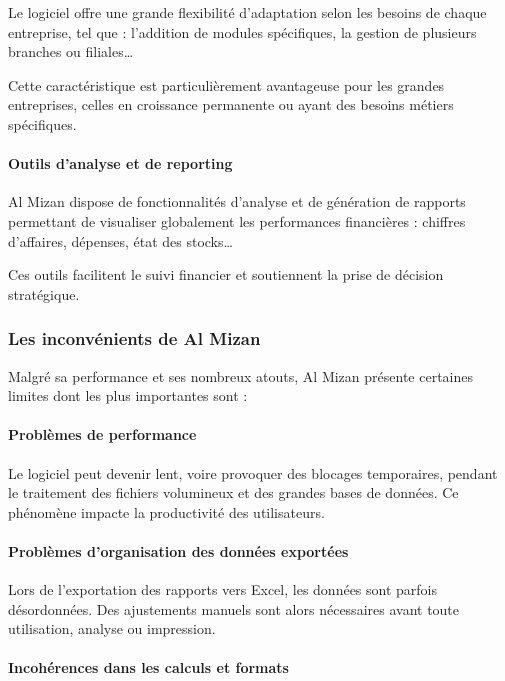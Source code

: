 \documentclass[a4paper,12pt]{report}
\begin{document}
Le logiciel offre une grande flexibilité d'adaptation selon les besoins de chaque entreprise, tel que : l'addition de modules spécifiques, la gestion de plusieurs branches ou filiales…

Cette caractéristique est particulièrement avantageuse pour les grandes entreprises, celles en croissance permanente ou ayant des besoins métiers spécifiques.

\paragraph{Outils d'analyse et de reporting}

Al Mizan dispose de fonctionnalités d'analyse et de génération de rapports permettant de visualiser globalement les performances financières : chiffres d'affaires, dépenses, état des stocks…

Ces outils facilitent le suivi financier et soutiennent la prise de décision stratégique.

\subsubsection{Les inconvénients de Al Mizan}

Malgré sa performance et ses nombreux atouts, Al Mizan présente certaines limites dont les plus importantes sont :

\paragraph{Problèmes de performance}

Le logiciel peut devenir lent, voire provoquer des blocages temporaires, pendant le traitement des fichiers volumineux et des grandes bases de données. Ce phénomène impacte la productivité des utilisateurs.

\paragraph{Problèmes d'organisation des données exportées}

Lors de l'exportation des rapports vers Excel, les données sont parfois désordonnées. Des ajustements manuels sont alors nécessaires avant toute utilisation, analyse ou impression.

\paragraph{Incohérences dans les calculs et formats}
\end{document}
